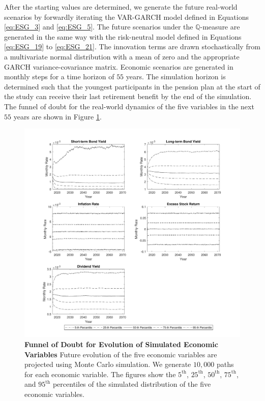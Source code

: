 \documentclass{sfuthesis}
\numberwithin{equation}{chapter}
\begin{document}
		\vspace{-0.4cm}
		\justify
		After the starting values are determined, we generate the future real-world scenarios by forwardly iterating the VAR-GARCH model defined in Equations \eqref{eq:ESG_3} and \eqref{eq:ESG_5}. The future scenarios under the $\mathbb{Q}$-measure are generated in the same way with the risk-neutral model defined in Equations \eqref{eq:ESG_19} to \eqref{eq:ESG_21}. The innovation terms are drawn stochastically from a multivariate normal distribution with a mean of zero and the appropriate GARCH variance-covariance matrix. Economic scenarios are generated in monthly steps for a time horizon of $55$ years. The simulation horizon is determined such that the youngest participants in the pension plan at the start of the study can receive their last retirement benefit by the end of the simulation. The funnel of doubt for the real-world dynamics of the five variables in the next $55$ years are shown in Figure \ref{fig:Funnel of Doubt for Evolution of Simulated Economic Variables}.
    		\begin{figure}[h]
			\includegraphics[width=1\linewidth]{ResultPlot/projrate.pdf} 
			\caption[Funnel of Doubt for Evolution of Simulated Economic Variables]{\textbf{Funnel of Doubt for Evolution of Simulated Economic Variables}
				\vspace{-0.4cm}
				\newline\footnotesize \justify Future evolution of the five economic variables are projected using Monte Carlo simulation. We generate $10{,}000$ paths for each economic variable. The figures show the $5^{\text{th}}$, $25^{\text{th}}$, $50^{\text{th}}$, $75^{\text{th}}$, and $95^{\text{th}}$ percentiles of the simulated distribution of the five economic variables.}
			\label{fig:Funnel of Doubt for Evolution of Simulated Economic Variables}
		\end{figure}    
        
\end{document}
